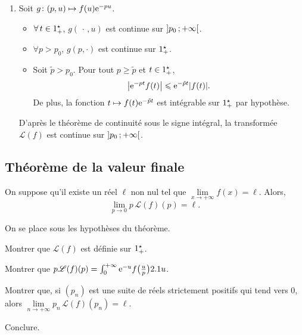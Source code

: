\begin{demo}
\begin{enumerate}
\item Soit $\fonctionligne[g]{(p, u)}{f(u) \e^{-p u}}$.
\begin{itemize}
\item $\forall t \in \Rpe$, $g(\,\cdot\,, u)$ est continue sur $\interoo{p_0}{+\infty}$.
\item $\forall p > p_0$, $g(p, \cdot)$ est continue sur $\Rpe$.
\item Soit $\tilde{p} > p_0$. Pour tout $p \geqslant \tilde{p}$ et $t \in \Rpe$,
\[
\abs{\e^{-p t} f(t)} \leqslant \e^{- \tilde{p} t} \abs{f(t)}.
\]
De plus, la fonction $t \mapsto f(t) \e^{-\tilde{p} t}$ est intégrable sur $\Rpe$ par hypothèse.
\end{itemize}
D'après le théorème de continuité sous le signe intégral, la transformée $\mathscr{L}(f)$ est continue sur $\interoo{p_0}{+\infty}$.
\end{enumerate}
\end{demo}


\subsection{Théorème de la valeur finale}

\begin{theo}
On suppose qu'il existe un réel $\ell$ non nul tel que $\lim\limits_{x \to +\infty} f(x) = \ell$. Alors,
\[
\lim_{p\to 0} p\, \mathscr{L}(f)(p) = \ell.
\]
\end{theo}

\begin{exercice}
On se place sous les hypothèses du théorème.
\begin{questions}
\item Montrer que $\mathscr{L}(f)$ est définie sur $\Rpe$.

\item Montrer que $p \mathscr{L}(f)(p) = \int_0^{+\infty} \e^{-u} f\big(\frac{u}{p}\big) \d u$.

\item Montrer que, si $(p_n)$ est une suite de réels strictement positifs qui tend vers $0$, alors $\lim\limits_{n\to+\infty} p_n\, \mathscr{L}(f)(p_n) = \ell$.

\item Conclure.
\end{questions}
\end{exercice}

